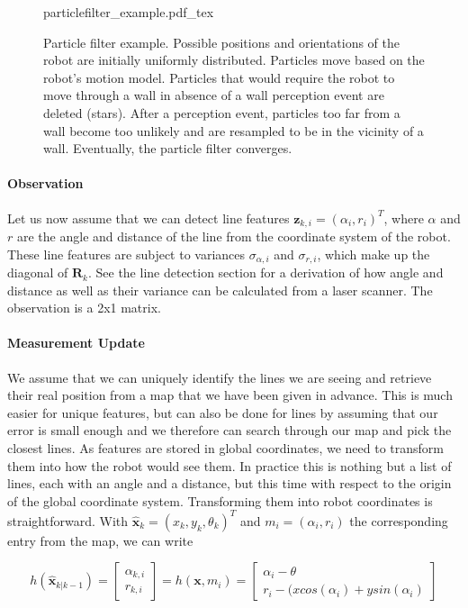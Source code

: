 \begin{figure}[!htb]
	\centering
    \def\svgwidth{0.92\textwidth}
    {particlefilter_example.pdf_tex}
	\caption{Particle filter example. Possible positions and orientations of the robot are initially uniformly distributed. Particles move based on the robot's motion model. Particles that would require the robot to move through a wall in absence of a wall perception event are deleted (stars). After a perception event, particles too far from a wall become too unlikely and are resampled to be in the vicinity of a wall. Eventually, the particle filter converges.
	\label{fig:particlefilter_example}}
\end{figure}


\paragraph{Observation}
Let us now assume that we can detect line features $ \boldsymbol{z}_{k,i}=(\alpha_i,r_i)^T$, where $ \alpha$ and $ r$ are the angle and distance of the line from the coordinate system of the robot. These line features are subject to variances $ \sigma_{\alpha,i}$ and $ \sigma_{r,i}$, which make up the diagonal of $ \boldsymbol{R}_{k}$. See the line detection section for a derivation of how angle and distance as well as their variance can be calculated from a laser scanner. The observation is a 2x1 matrix.

\paragraph{Measurement Update}
We assume that we can uniquely identify the lines we are seeing and retrieve their real position from a map that we have been given in advance. This is much easier for unique features, but can also be done for lines by assuming that our error is small enough and we therefore can search through our map and pick the closest lines. As features are stored in global coordinates, we need to transform them into how the robot would see them. In practice this is nothing but a list of lines, each with an angle and a distance, but this time with respect to the origin of the global coordinate system. Transforming them into robot coordinates is straightforward. With  $ \hat{\boldsymbol{x}}_{k}=(x_{k},y_{k},\theta_k)^T$ and $ m_i=(\alpha_i,r_i)$ the corresponding entry from the map, we can write

\begin{equation} h(\hat{\boldsymbol{x}}_{k|k-1})=\left[\begin{array}{c}\alpha_{k,i}\\r_{k,i}\end{array}\right]=h(\boldsymbol{x},m_i)=\left[\begin{array}{c}\alpha_i-\theta\\r_i-(x cos(\alpha_i)+y sin(\alpha_i)\end{array}\right]
\end{equation}

